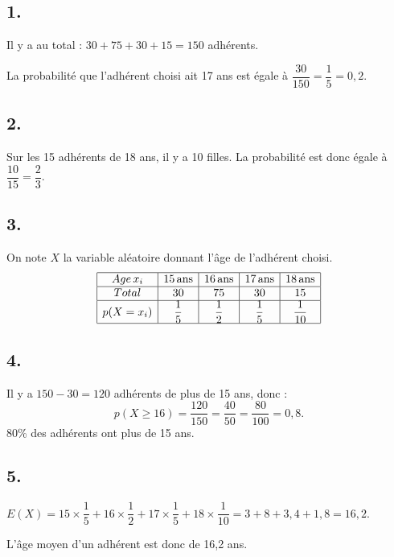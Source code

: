 \subsection*{1.}

Il y a au total : \(30 + 75 + 30 + 15 = 150\) adhérents.

La probabilité que l'adhérent choisi ait 17 ans est égale à \(\dfrac{30}{150} = \dfrac{1}{5} = 0,2\).

\subsection*{2.}

Sur les 15 adhérents de 18 ans, il y a 10 filles. La probabilité est donc égale à \(\dfrac{10}{15} = \dfrac{2}{3}\).

\subsection*{3.}

On note \(X\) la variable aléatoire donnant l'âge de l'adhérent choisi.
\[
\begin{array}{|c|c|c|c|c|}
\hline
Age \, x_i & 15 \, \text{ans} & 16 \, \text{ans} & 17 \, \text{ans} & 18 \, \text{ans} \\
\hline
Total & 30 & 75 & 30 & 15 \\
\hline
p(X = x_i) & \dfrac{1}{5} & \dfrac{1}{2} & \dfrac{1}{5} & \dfrac{1}{10} \\
\hline
\end{array}
\]

\subsection*{4.}

Il y a \(150 - 30 = 120\) adhérents de plus de 15 ans, donc :
\[
p(X \geqslant 16) = \dfrac{120}{150} = \dfrac{40}{50} = \dfrac{80}{100} = 0,8.
\]
80\% des adhérents ont plus de 15 ans.

\subsection*{5.}

\(
E(X) = 15 \times \dfrac{1}{5} + 16 \times \dfrac{1}{2} + 17 \times \dfrac{1}{5} + 18 \times \dfrac{1}{10} = 3 + 8 + 3,4 + 1,8 = 16,2.
\)

L'âge moyen d'un adhérent est donc de 16,2 ans.
